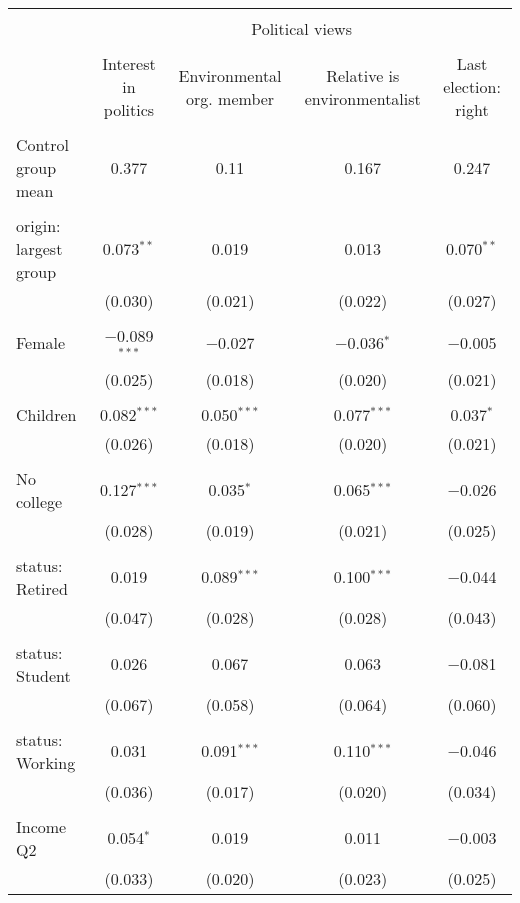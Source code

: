 
\begin{tabular}{@{\extracolsep{5pt}}lcccc} 
\\[-1.8ex]\hline 
\hline \\[-1.8ex] 
 & \multicolumn{4}{c}{Political views} \\ 
\cline{2-5} 
\\[-1.8ex] & Interest in politics & Environmental org. member & Relative is environmentalist & Last election: right \\ 
\hline \\[-1.8ex] 
 Control group mean & 0.377 & 0.11 & 0.167 & 0.247  \\ \hline \\[-1.8ex] origin: largest group & 0.073$^{**}$ & 0.019 & 0.013 & 0.070$^{**}$ \\ 
  & (0.030) & (0.021) & (0.022) & (0.027) \\ 
  & & & & \\ 
 Female & $-$0.089$^{***}$ & $-$0.027 & $-$0.036$^{*}$ & $-$0.005 \\ 
  & (0.025) & (0.018) & (0.020) & (0.021) \\ 
  & & & & \\ 
 Children & 0.082$^{***}$ & 0.050$^{***}$ & 0.077$^{***}$ & 0.037$^{*}$ \\ 
  & (0.026) & (0.018) & (0.020) & (0.021) \\ 
  & & & & \\ 
 No college & 0.127$^{***}$ & 0.035$^{*}$ & 0.065$^{***}$ & $-$0.026 \\ 
  & (0.028) & (0.019) & (0.021) & (0.025) \\ 
  & & & & \\ 
 status: Retired & 0.019 & 0.089$^{***}$ & 0.100$^{***}$ & $-$0.044 \\ 
  & (0.047) & (0.028) & (0.028) & (0.043) \\ 
  & & & & \\ 
 status: Student & 0.026 & 0.067 & 0.063 & $-$0.081 \\ 
  & (0.067) & (0.058) & (0.064) & (0.060) \\ 
  & & & & \\ 
 status: Working & 0.031 & 0.091$^{***}$ & 0.110$^{***}$ & $-$0.046 \\ 
  & (0.036) & (0.017) & (0.020) & (0.034) \\ 
  & & & & \\ 
 Income Q2 & 0.054$^{*}$ & 0.019 & 0.011 & $-$0.003 \\ 
  & (0.033) & (0.020) & (0.023) & (0.025) \\ 

\end{tabular}
